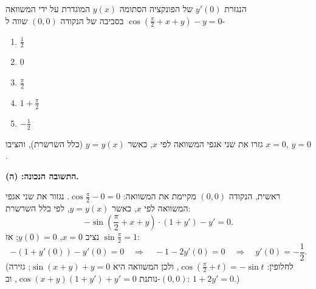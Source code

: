 
\begin{question}
הנגזרת $y'(0)$ של הפונקציה הסתומה $y(x)$ המוגדרת על ידי המשוואה $\cos\left(\frac{\pi}{2}+x+y\right)-y=0$ בסביבה של הנקודה $(0,0)$ שווה ל-
\begin{enumerate}
  \item[(א)] $\frac12$
  \item[(ב)] $0$
  \item[(ג)] $\frac{\pi}{2}$
  \item[(ד)] $1+\frac{\pi}{2}$
  \item[(ה)] $-\frac12$
\end{enumerate}
\end{question}

\begin{hint}
גזרו את שני אגפי המשוואה לפי $x$, כאשר $y=y(x)$ (כלל השרשרת), והציבו $x=0$, $y=0$.
\end{hint}

\begin{solution}
\textbf{התשובה הנכונה: (ה).}

ראשית, הנקודה $(0,0)$ מקיימת את המשוואה: $\cos\frac{\pi}{2}-0=0$. נגזור את שני אגפי המשוואה לפי $x$, כאשר $y=y(x)$, לפי כלל השרשרת:
\[ -\sin\left(\frac{\pi}{2}+x+y\right)\cdot\left(1+y'\right) - y' = 0. \]
נציב $x=0$, $y(0)=0$; אז $\sin\frac{\pi}{2}=1$:
\[ -(1+y'(0)) - y'(0) = 0 \quad\Longrightarrow\quad -1-2y'(0)=0 \quad\Longrightarrow\quad y'(0) = -\frac12. \]
(לחלופין: $\cos\left(\frac\pi2+t\right)=-\sin t$, ולכן המשוואה היא $\sin(x+y)+y=0$; גזירה נותנת $\cos(x+y)(1+y')+y'=0$, וב-$(0,0)$: $1+2y'=0$.)
\end{solution}
